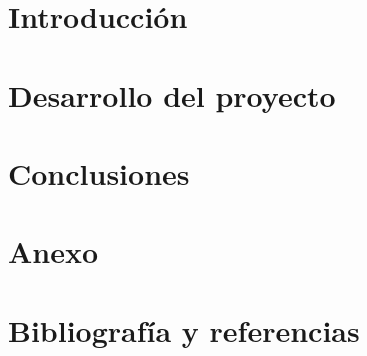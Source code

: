 \documentclass[12pt,a4paper]{book}
\begin{document}
\frontmatter










\mainmatter



\part{Introducción}



\part{Desarrollo del proyecto}





\part{Conclusiones}



\part{Anexo}
\appendix



\backmatter
\part{Bibliografía y referencias}

\end{document}
